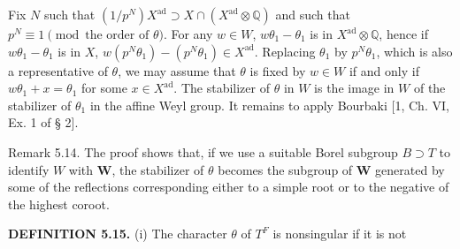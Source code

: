 \documentclass[9pt,twoside]{extarticle}
\begin{document}
{Fix \(N\) such that \((1/p^N)X^{\mathrm{ad}}\supset X\cap(X^{\mathrm{ad}}\otimes\mathbb Q)\) and such that \(p^N\equiv1\pmod{\text{the order of }\theta}\). For any \(w\in W\), \(w\theta_1-\theta_1\) is in \(X^{\mathrm{ad}}\otimes\mathbb Q\), hence if \(w\theta_1-\theta_1\) is in \(X\), \(w(p^N\theta_1)-(p^N\theta_1)\in X^{\mathrm{ad}}\). Replacing \(\theta_1\) by \(p^N\theta_1\), which is also a representative of \(\theta\), we may assume that \(\theta\) is fixed by \(w\in W\) if and only if \(w\theta_1+x=\theta_1\) for some \(x\in X^{\mathrm{ad}}\). The stabilizer of \(\theta\) in \(W\) is the image in \(W\) of the stabilizer of \(\theta_1\) in the affine Weyl group. It remains to apply Bourbaki [1, Ch. VI, Ex. 1 of § 2].\par

Remark 5.14. The proof shows that, if we use a suitable Borel subgroup \(B\supset T\) to identify \(W\) with \(\mathbf W\), the stabilizer of \(\theta\) becomes the subgroup of \(\mathbf W\) generated by some of the reflections corresponding either to a simple root or to the negative of the highest coroot.\par

\noindent\textbf{DEFINITION 5.15.} (i) The character \(\theta\) of \(T^F\) is nonsingular if it is not\par
}
\end{document}
